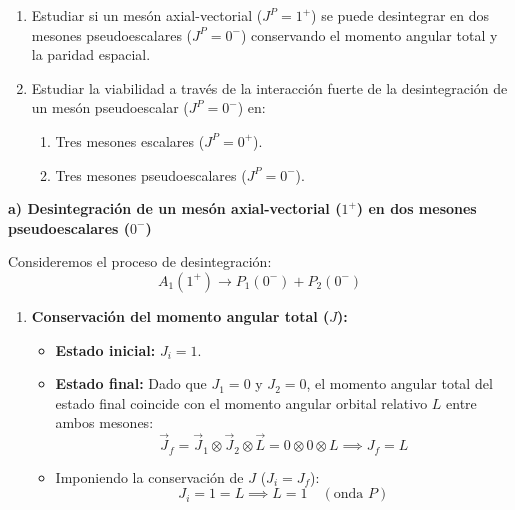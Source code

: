\newpage
\begin{problema}
\begin{enumerate}[label=\alph*)]
    \item Estudiar si un mesón axial-vectorial ($J^P = 1^+$) se puede desintegrar en dos mesones pseudoescalares ($J^P = 0^-$) conservando el momento angular total y la paridad espacial.
    \item Estudiar la viabilidad a través de la interacción fuerte de la desintegración de un mesón pseudoescalar ($J^P = 0^-$) en:
    \begin{enumerate}[label=\arabic*.]
        \item Tres mesones escalares ($J^P = 0^+$).
        \item Tres mesones pseudoescalares ($J^P = 0^-$).
    \end{enumerate}
\end{enumerate}

\tcblower

\textbf{a) Desintegración de un mesón axial-vectorial ($1^+$) en dos mesones pseudoescalares ($0^-$)}

Consideremos el proceso de desintegración:
\begin{equation*}
    A_1 (1^+) \longrightarrow P_1 (0^-) + P_2 (0^-)
\end{equation*}

\begin{enumerate}[label=\arabic*.]
    \item \textbf{Conservación del momento angular total ($J$):}
    \begin{itemize}
        \item \textbf{Estado inicial:} $J_i = 1$.
        \item \textbf{Estado final:} Dado que $J_1 = 0$ y $J_2 = 0$, el momento angular total del estado final coincide con el momento angular orbital relativo $L$ entre ambos mesones:
        \begin{equation*}
            \vec{J}_f = \vec{J}_1 \otimes \vec{J}_2 \otimes \vec{L} = 0 \otimes 0 \otimes L \implies J_f = L
        \end{equation*}
        \item Imponiendo la conservación de $J$ ($J_i = J_f$):
        \begin{equation*}
            J_i = 1 = L \implies L = 1 \quad (\text{onda } P)
        \end{equation*}
    \end{itemize}


\end{enumerate}
\end{problema}
